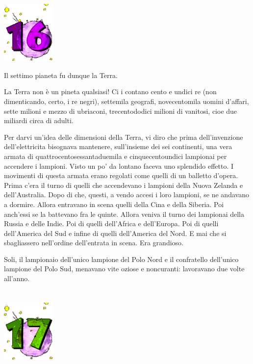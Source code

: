 \documentclass[11pt]{scrbook}
\begin{document}
\chapter{}
\begin{center}
\includegraphics{img/chapter16}
\end{center}

Il settimo pianeta fu dunque la Terra.

La Terra non è un pineta qualsiasi! Ci i contano cento e undici re (non
dimenticando, certo, i re negri), settemila geografi, novecentomila
uomini d'affari, sette milioni e mezzo di ubriaconi, trecentododici
milioni di vanitosi, cioe due miliardi circa di adulti.

Per darvi un'idea delle dimensioni della Terra, vi diro che prima
dell'invenzione dell'elettricita bisognava mantenere, sull'insieme dei
sei continenti, una vera armata di quattrocentosessantaduemila e
cinquecentoundici lampionai per accendere i lampioni. Visto un po' da
lontano faceva uno splendido effetto. I movimenti di questa armata erano
regolati come quelli di un balletto d'opera. Prima c'era il turno di
quelli che accendevano i lampioni della Nuova Zelanda e dell'Australia.
Dopo di che, questi, a vendo accesi i loro lampioni, se ne andavano a
dormire. Allora entravano in scena quelli della Cina e della Siberia.
Poi anch'essi se la battevano fra le quinte. Allora veniva il turno dei
lampionai della Russia e delle Indie. Poi di quelli dell'Africa e
dell'Europa. Poi di quelli dell'America del Sud e infine di quelli
dell'America del Nord. E mai che si sbagliassero nell'ordine
dell'entrata in scena. Era grandioso.

Soli, il lampionaio dell'unico lampione del Polo Nord e il confratello
dell'unico lampione del Polo Sud, menavano vite oziose e noncuranti:
lavoravano due volte all'anno.

\chapter{}
\begin{center}
\includegraphics{img/chapter17}
\end{center}
\end{document}
